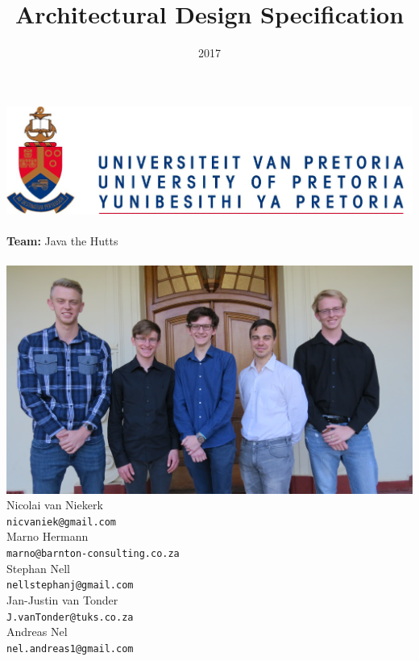 \documentclass{article}
\title{Architectural Design Specification}
\date{2017}
\begin{document}
\makeatletter
    \begin{titlepage}
        \begin{center}
            \includegraphics[width=0.7\linewidth]{img/up.png}\\[4ex]
            {\huge \bfseries \@title }\\[2ex]
            {\LARGE \textbf{Team:} Java the Hutts}\\[2ex]
            {\LARGE \@date}\\[2ex]
            {\includegraphics[width=\linewidth]{img/team_photo.jpg}}\\[2ex]
            {\large  Nicolai van Niekerk\\ \texttt{nicvaniek@gmail.com}}\\[2ex]
            {\large  Marno Hermann\\ \texttt{marno@barnton-consulting.co.za}}\\[2ex]
            {\large  Stephan Nell\\ \texttt{nellstephanj@gmail.com}}\\[2ex]
            {\large  Jan-Justin van Tonder\\ \texttt{J.vanTonder@tuks.co.za}}\\[2ex]
            {\large  Andreas Nel\\ \texttt{nel.andreas1@gmail.com}}\\[2ex]
        \end{center}
        
    \end{titlepage}
\makeatother
\end{document}
